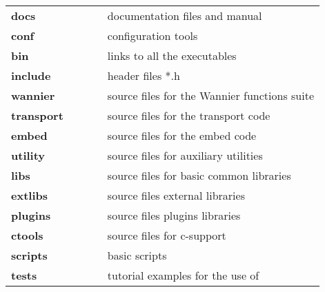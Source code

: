 \begin{tabular}{lll}
{\bf docs}          & $\qquad$  &   documentation files and manual \\
{\bf conf}          & $\qquad$  &   configuration tools \\
{\bf bin}           & $\qquad$  &   links to all the executables \\
{\bf include}       & $\qquad$  &   header files *.h \\
{\bf wannier}       & $\qquad$  &   source files for the Wannier functions suite \\
{\bf transport}     & $\qquad$  &   source files for the transport code \\
{\bf embed}         & $\qquad$  &   source files for the embed code \\
{\bf utility}       & $\qquad$  &   source files for auxiliary utilities\\
{\bf libs}          & $\qquad$  &   source files for basic common libraries \\
{\bf extlibs}       & $\qquad$  &   source files external libraries \\
{\bf plugins}       & $\qquad$  &   source files plugins libraries \\
{\bf ctools}        & $\qquad$  &   source files for c-support\\
{\bf scripts}       & $\qquad$  &   basic scripts\\
{\bf tests}         & $\qquad$  &   tutorial examples for the use of \WANT{}\\
\end{tabular}

